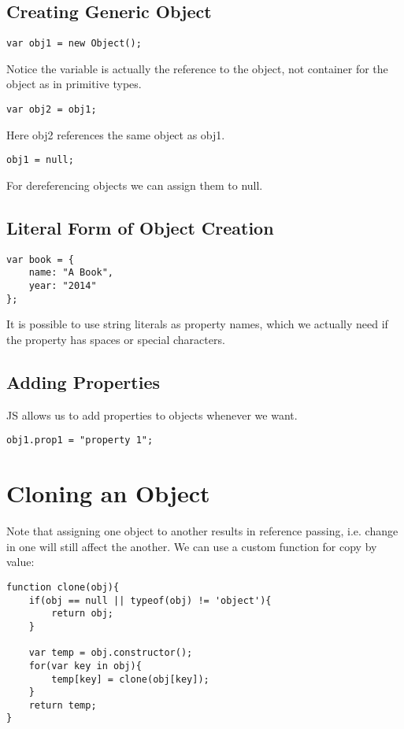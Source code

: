 \documentclass[12pt, a4paper]{article}
\begin{document}
\subsection{Creating Generic Object}
\begin{verbatim}
var obj1 = new Object();
\end{verbatim}
Notice the variable is actually the reference to the object, not container for the object as in primitive types.

\begin{verbatim}
var obj2 = obj1;
\end{verbatim}
Here obj2 references the same object as obj1.

\begin{verbatim}
obj1 = null;
\end{verbatim}
For dereferencing objects we can assign them to null.
\subsection{Literal Form of Object Creation}
\begin{verbatim}
var book = {
    name: "A Book",
    year: "2014"
};
\end{verbatim}
It is possible to use string literals as property names, which we actually need if the property has spaces or special characters.
\subsection{Adding Properties}
JS allows us to add properties to objects whenever we want.
\begin{verbatim}
obj1.prop1 = "property 1";
\end{verbatim}

\section{Cloning an Object}
Note that assigning one object to another results in reference passing, i.e.
change in one will still affect the another. We can use a custom function for copy
by value:
\begin{verbatim}
function clone(obj){
    if(obj == null || typeof(obj) != 'object'){
        return obj;
    }

    var temp = obj.constructor();
    for(var key in obj){
        temp[key] = clone(obj[key]);
    }
    return temp;
}
\end{verbatim}
\end{document}
